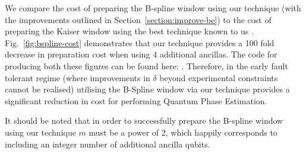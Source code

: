 \documentclass[aps,prx,twocolumn,floatfix,10pt,amssymb,amsfont,amsmath,superscriptaddress,float,nofootinbib,longbibliography,nobalancelastpage]{revtex4-2}
\theoremstyle{empty}
\begin{document}
We compare the cost of preparing the B-spline window using our technique (with the improvements outlined in Section~\ref{section:improve-be}) to the cost of preparing the Kaiser window using the best technique known to us \cite{mcardleQuantumStatePreparation2022, Greenaway:2024jzs}. Fig.~\ref{fig:bspline-cost} demonstrates that our technique provides a 100 fold decrease in preparation cost when using 4 additional ancillas. The code for producing both these figures can be found here: \cite{o_brien_2025_14794186}. Therefore, in the early fault tolerant regime (where improvements in $\delta$ beyond experimental constraints cannot be realised) utilising the B-Spline window via our technique provides a significant reduction in cost for performing Quantum Phase Estimation.

It should be noted that in order to successfully prepare the B-spline window using our technique $m$ must be a power of 2, which happily corresponds to including an integer number of additional ancilla qubits.
\end{document}
